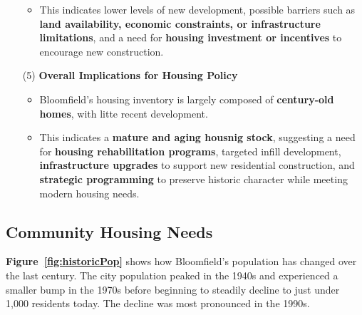\begin{itemize}
\begin{itemize}
        \item This indicates lower levels of new development, possible barriers such as \textbf{land availability, economic constraints, or infrastructure limitations}, and a need for \textbf{housing investment or incentives} to encourage new construction.
    \end{itemize}
    \item [(5)] \textbf{\textcolor{coBalt}{Overall Implications for Housing Policy}}
    \begin{itemize}
        \item Bloomfield's housing inventory is largely composed of \textbf{century-old homes}, with litte recent development.
        \item This indicates a \textbf{mature and aging housnig stock}, suggesting a need for \textbf{housing rehabilitation programs}, targeted infill development, \textbf{infrastructure upgrades} to support new residential construction, and \textbf{strategic programming} to preserve historic character while meeting modern housing needs.
    \end{itemize}
\end{itemize}

\newpage
\thispagestyle{empty}
\begin{landscape}
    
\end{landscape}
\newpage

\pagebreak
\subsection{Community Housing Needs}


\noindent \textbf{Figure~\ref{fig:historicPop}} shows how Bloomfield's population has changed over the last century. The city population peaked in the 1940s and experienced a smaller bump in the 1970s before beginning to steadily decline to just under 1,000 residents today. The decline was most pronounced in the 1990s.

